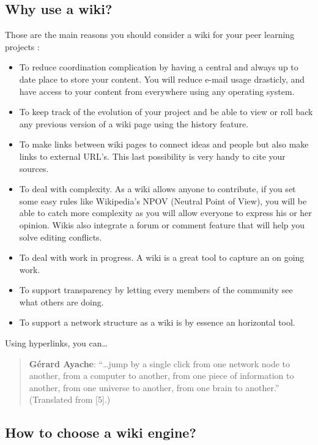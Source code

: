 \subsection{Why use a wiki?}

Those are the main reasons you should consider a wiki for your peer
learning projects :

\begin{itemize}
\item
  To reduce coordination complication by having a central and always up
  to date place to store your content. You will reduce e-mail usage
  drasticly, and have access to your content from everywhere using any
  operating system.
\item
  To keep track of the evolution of your project and be able to view or
  roll back any previous version of a wiki page using the history
  feature.
\item
  To make links between wiki pages to connect ideas and people but also
  make links to external URL's. This last possibility is very handy to
  cite your sources.
\item
  To deal with complexity. As a wiki allows anyone to contribute, if you
  set some easy rules like Wikipedia's NPOV (Neutral Point of View), you
  will be able to catch more complexity as you will allow everyone to
  express his or her opinion. Wikis also integrate a forum or comment
  feature that will help you solve editing conflicts.
\item
  To deal with work in progress. A wiki is a great tool to capture an on
  going work.
\item
  To support transparency by letting every members of the community see
  what others are doing.
\item
  To support a network structure as a wiki is by essence an horizontal
  tool. 
\end{itemize}

Using hyperlinks, you can\ldots{}

\begin{quote}
\textbf{Gérard Ayache}: ``\ldots{}jump by a single
  click from one network node to another, from a computer to another,
  from one piece of information to another, from one universe to
  another, from one brain to another.'' (Translated from {[}5{]}.)
\end{quote}

\subsection{How to choose a wiki engine?}

